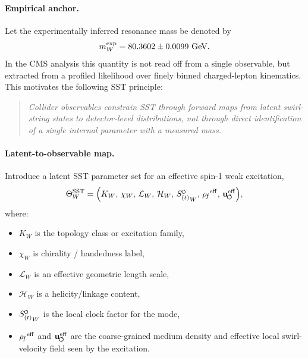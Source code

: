 \documentclass[11pt]{article}
\theoremstyle{definition}
\theoremstyle{plain}
\theoremstyle{remark}
\newcommand{\swirlarrow}{\mathchoice{\mkern-2mu\scriptstyle\boldsymbol{\circlearrowleft}}{\mkern-2mu\scriptstyle\boldsymbol{\circlearrowleft}}{\mkern-2mu\scriptscriptstyle\boldsymbol{\circlearrowleft}}{\mkern-2mu\scriptscriptstyle\boldsymbol{\circlearrowleft}}}
\newcommand{\rhoF}{{\rho_{\!f}}}
\newcommand{\SwirlClock}{{S_{(t)}^{\swirlarrow}}}
\newcommand{\uswirl}{\mathbf{u}_{\!\boldsymbol{\circlearrowleft}}}
\begin{document}
        \paragraph{Empirical anchor.}
            Let the experimentally inferred resonance mass be denoted by
            \begin{equation}
                m_W^{\rm exp} = 80.3602 \pm 0.0099~{\rm GeV}.
            \end{equation}
            In the CMS analysis this quantity is not read off from a single observable, but extracted from a profiled likelihood over finely binned charged-lepton kinematics. This motivates the following SST principle:
            
            \begin{quote}
                \emph{Collider observables constrain SST through forward maps from latent swirl-string states to detector-level distributions, not through direct identification of a single internal parameter with a measured mass.}
            \end{quote}
    
        \paragraph{Latent-to-observable map.}
            Introduce a latent SST parameter set for an effective spin-1 weak excitation,
            \begin{equation}
                \Theta_{W}^{\rm SST}
                =
                \Bigl(
                K_W,\,
                \chi_W,\,
                \mathcal{L}_W,\,
                \mathcal{H}_W,\,
                \SwirlClock_W,\,
                \rhoF^{\rm eff},\,
                \uswirl^{\rm eff}
                \Bigr),
            \end{equation}
            where:
            \begin{itemize}
                \item $K_W$ is the topology class or excitation family,
                \item $\chi_W$ is chirality / handedness label,
                \item $\mathcal{L}_W$ is an effective geometric length scale,
                \item $\mathcal{H}_W$ is a helicity/linkage content,
                \item $\SwirlClock_W$ is the local clock factor for the mode,
                \item $\rhoF^{\rm eff}$ and $\uswirl^{\rm eff}$ are the coarse-grained medium density and effective local swirl-velocity field seen by the excitation.
            \end{itemize}
            
\end{document}
